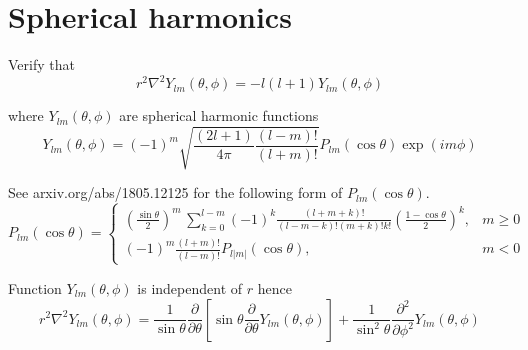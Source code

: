 

\section*{Spherical harmonics}

Verify that
\begin{equation*}
r^2\nabla^2Y_{lm}(\theta,\phi)=-l(l+1)Y_{lm}(\theta,\phi)
\tag{1}
\end{equation*}

where $Y_{lm}(\theta,\phi)$ are spherical harmonic functions
\begin{equation*}
Y_{lm}(\theta,\phi)=(-1)^m\sqrt{\frac{(2l+1)}{4\pi}\frac{(l-m)!}{(l+m)!}}
P_{lm}(\cos\theta)\exp(im\phi)
\end{equation*}

See arxiv.org/abs/1805.12125 for the following form of $P_{lm}(\cos\theta)$.
\begin{equation*}
P_{lm}(\cos\theta)=\begin{cases}\displaystyle
\left(\frac{\sin\theta}{2}\right)^m\,\sum_{k=0}^{l-m}
(-1)^k\frac{(l+m+k)!}{(l-m-k)!(m+k)!k!}
\left(\frac{1-\cos\theta}{2}\right)^k, & m\ge0
\\[4ex]
\displaystyle(-1)^m\frac{(l+m)!}{(l-m)!}P_{l|m|}(\cos\theta), & m<0
\end{cases}
\end{equation*}

Function $Y_{lm}(\theta,\phi)$ is independent of $r$ hence
\begin{equation*}
r^2\nabla^2Y_{lm}(\theta,\phi)=\frac{1}{\sin\theta}\frac{\partial}{\partial\theta}
\left[\sin\theta\frac{\partial}{\partial\theta}Y_{lm}(\theta,\phi)\right]
+\frac{1}{\sin^2\theta}\frac{\partial^2}{\partial\phi^2}Y_{lm}(\theta,\phi)
\end{equation*}


